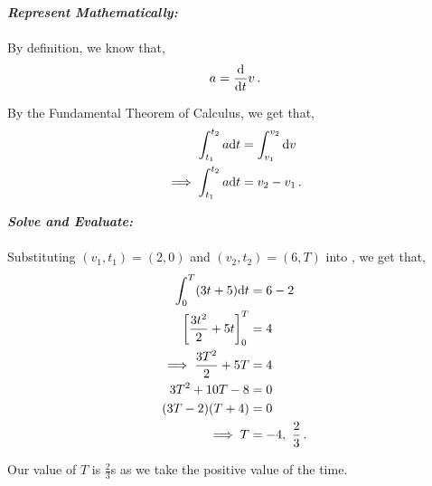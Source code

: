 \begin{subquestions}
\textbf{\textit{Represent Mathematically:}} \\ \\
By definition, we know that,
\begin{equation}
	a = \frac{\mathrm{d}}{\mathrm{d}t}v \,.
\end{equation}

By the Fundamental Theorem of Calculus, we get that,
\begin{align}
	\int_{t_1}^{t_2}a \mathrm{d} t & = \int_{v_1}^{v_2} \mathrm{d} v \nonumber \\
	\implies \int_{t_1}^{t_2}a \mathrm{d} t & = v_2-v_1 \,. \label{2014:q6:FTC1}
\end{align}




\textbf{\textit{Solve and Evaluate:}} \\ \\
Substituting $(v_1,t_1)=(2,0)$ and $(v_2,t_2)=(6,T)$ into , we get that,
\begin{align}
	\int_{0}^{T} (3t+5) \mathrm{d} t & = 6-2 \nonumber \\
	\left[\frac{3t^2}{2} +5t \right]^T_0 & = 4 \nonumber \\
	\implies \frac{3T^2}{2} +5T & = 4 \nonumber \\
	3T^2 +10T-8 & = 0 \nonumber \\
	(3T-2)(T+4) & = 0 \nonumber \\
	\implies T & = -4,~\frac{2}{3} \,.
\end{align}

Our value of $T$ is $\frac{2}{3}$s as we take the positive value of the time. 


\subquestion


\end{subquestions}
